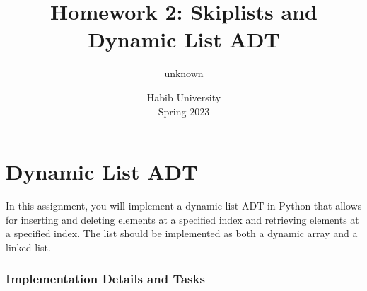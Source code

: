 \documentclass[addpoints]{exam}
\title{Homework 2: Skiplists and Dynamic List ADT}
\author{unknown}  %
\date{Habib University\\Spring 2023}
\begin{document}
\maketitle
\part{Dynamic List ADT}

In this assignment, you will implement a dynamic list ADT in Python that allows for inserting and deleting elements at a specified index and retrieving elements at a specified index.
The list should be implemented as both a dynamic array and a linked list.


\section{Implementation Details and Tasks}
\end{document}
